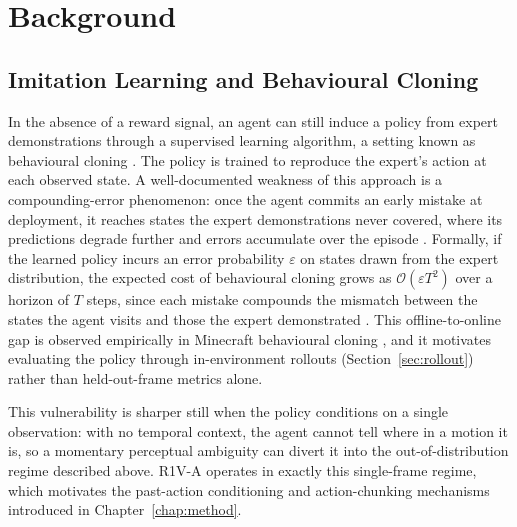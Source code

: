 
\chapter{Background}
\label{chap:background}



\section{Imitation Learning and Behavioural Cloning}
\label{sec:bg-il}
In the absence of a reward signal, an agent can still induce a policy from
expert demonstrations through a supervised learning algorithm, a setting
known as behavioural cloning \cite{Bain1995AFF}. The policy is trained to
reproduce the expert's action at each observed state. A well-documented
weakness of this approach is a compounding-error phenomenon: once the agent
commits an early mistake at deployment, it reaches states the expert
demonstrations never covered, where its predictions degrade further and
errors accumulate over the episode \cite{ross2011}. Formally, if the learned
policy incurs an error probability $\varepsilon$ on states drawn from the
expert distribution, the expected cost of behavioural cloning grows as
$\mathcal{O}(\varepsilon T^2)$ over a horizon of $T$ steps, since each
mistake compounds the mismatch between the states the agent visits and those
the expert demonstrated \cite{ross2011}. This offline-to-online gap is
observed empirically in Minecraft behavioural cloning \cite{kanervisto2020},
and it motivates evaluating the policy through in-environment rollouts
(Section~\ref{sec:rollout}) rather than held-out-frame metrics alone.

This vulnerability is sharper still when the policy conditions on a single
observation: with no temporal context, the agent cannot tell where in a
motion it is, so a momentary perceptual ambiguity can divert it into the
out-of-distribution regime described above. R1V-A operates in exactly this
single-frame regime, which motivates the past-action conditioning and
action-chunking mechanisms introduced in Chapter~\ref{chap:method}.

